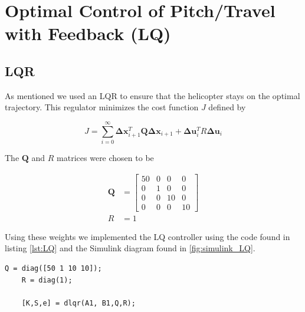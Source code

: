
\section{Optimal Control of Pitch/Travel with Feedback (LQ)}
\subsection{LQR}


As mentioned we used an LQR to ensure that the helicopter stays on the optimal trajectory. This regulator minimizes the cost function $J$ defined by

\begin{equation}
    J = \sum^{\infty}_{i=0} \mathbf{\Delta} \mathbf{x}^T_{i+1}\mathbf{Q}\mathbf{\Delta} \mathbf{x}_{i+1}+\mathbf{\Delta} \mathbf{u}_i^T R \mathbf{\Delta} \mathbf{u}_i
\end{equation}

The $\mathbf{Q}$ and $R$ matrices were chosen to be

\begin{subequations}
    \begin{align}
        \mathbf{Q} &= \begin{bmatrix}
            50 & 0 & 0 & 0\\
            0 & 1 & 0 & 0 \\
            0 & 0 & 10 & 0\\
            0 & 0 & 0 & 10
        \end{bmatrix}\\
        R &= 1
    \end{align}
\end{subequations}

Using these weights we implemented the LQ controller using the code found in listing \ref{lst:LQ} and the Simulink diagram found in \cref{fig:simulink_LQ}.

\begin{lstlisting}[caption={MATLAB code for LQ controller},label=lst:LQ]
    Q = diag([50 1 10 10]);
    R = diag(1);

    [K,S,e] = dlqr(A1, B1,Q,R);
\end{lstlisting}

